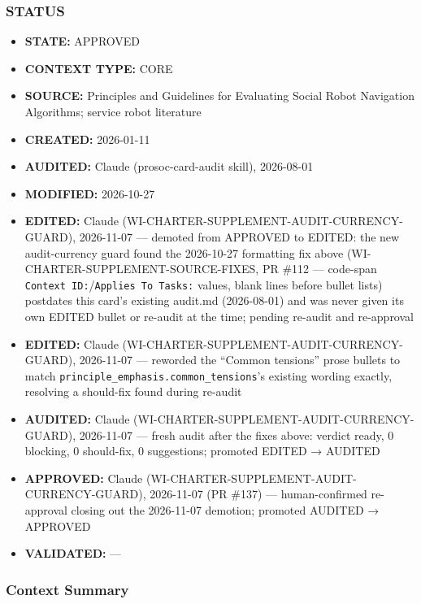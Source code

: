 \documentclass[utf8]{frontiers_suppmat} %
\providecommand{\tightlist}{%
  \setlength{\itemsep}{0pt}\setlength{\parskip}{0pt}}
\begin{document}
\subsubsection{STATUS}\label{status}

\begin{itemize}
\tightlist
\item
  \textbf{STATE:} APPROVED
\item
  \textbf{CONTEXT TYPE:} CORE
\item
  \textbf{SOURCE:} Principles and Guidelines for Evaluating Social Robot
  Navigation Algorithms; service robot literature
\item
  \textbf{CREATED:} 2026-01-11
\item
  \textbf{AUDITED:} Claude (prosoc-card-audit skill), 2026-08-01
\item
  \textbf{MODIFIED:} 2026-10-27
\item
  \textbf{EDITED:} Claude (WI-CHARTER-SUPPLEMENT-AUDIT-CURRENCY-GUARD),
  2026-11-07 --- demoted from APPROVED to EDITED: the new audit-currency
  guard found the 2026-10-27 formatting fix above
  (WI-CHARTER-SUPPLEMENT-SOURCE-FIXES, PR \#112 --- code-span
  \texttt{Context ID:}/\texttt{Applies To Tasks:}
  values, blank lines before bullet lists) postdates this card's
  existing audit.md (2026-08-01) and was never given its own EDITED
  bullet or re-audit at the time; pending re-audit and re-approval
\item
  \textbf{EDITED:} Claude (WI-CHARTER-SUPPLEMENT-AUDIT-CURRENCY-GUARD),
  2026-11-07 --- reworded the ``Common tensions'' prose bullets to match
  \texttt{principle\_emphasis.common\_tensions}'s
  existing wording exactly, resolving a should-fix found during re-audit
\item
  \textbf{AUDITED:} Claude (WI-CHARTER-SUPPLEMENT-AUDIT-CURRENCY-GUARD),
  2026-11-07 --- fresh audit after the fixes above: verdict ready, 0
  blocking, 0 should-fix, 0 suggestions; promoted EDITED → AUDITED
\item
  \textbf{APPROVED:} Claude
  (WI-CHARTER-SUPPLEMENT-AUDIT-CURRENCY-GUARD), 2026-11-07 (PR \#137)
  --- human-confirmed re-approval closing out the 2026-11-07 demotion;
  promoted AUDITED → APPROVED
\item
  \textbf{VALIDATED:} ---
\end{itemize}

\subsubsection{Context Summary}\label{context-summary}
\end{document}

